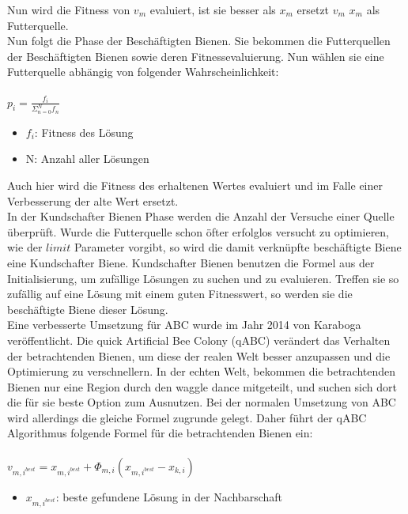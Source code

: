 Nun wird die Fitness von $v_{m}$ evaluiert, ist sie besser als $x_m$ ersetzt $v_m$ $x_m$ als Futterquelle.\\
Nun folgt die Phase der Beschäftigten Bienen. Sie bekommen die Futterquellen der Beschäftigten Bienen sowie deren Fitnessevaluierung.  Nun wählen sie eine Futterquelle abhängig von folgender Wahrscheinlichkeit:\\\\ 
\large
$p_i=\frac{f_i}{\Sigma^N_{n=0}f_n}$
\normalsize
\begin{itemize}
  \item $f_i$: Fitness des Lösung
  \item N: Anzahl aller Lösungen
\end{itemize}
Auch hier wird die Fitness des erhaltenen Wertes evaluiert und im Falle einer Verbesserung der alte Wert ersetzt.\\
In der Kundschafter Bienen Phase werden die Anzahl der Versuche einer Quelle überprüft. Wurde die Futterquelle schon öfter erfolglos versucht zu optimieren, wie der $limit$ Parameter vorgibt, so wird die damit verknüpfte beschäftigte Biene eine Kundschafter Biene. Kundschafter Bienen benutzen die Formel aus der Initialisierung, um zufällige Lösungen zu suchen und zu evaluieren. Treffen sie so  zufällig auf eine Lösung mit einem guten Fitnesswert, so werden sie die beschäftigte Biene dieser Lösung.\\
Eine verbesserte Umsetzung für ABC wurde im Jahr 2014 von Karaboga veröffentlicht. Die quick Artificial Bee Colony (qABC) verändert das Verhalten der betrachtenden Bienen, um diese der realen Welt besser anzupassen und die Optimierung zu verschnellern. In der echten Welt, bekommen die betrachtenden Bienen nur eine Region durch den waggle dance mitgeteilt, und suchen sich dort die für sie beste Option zum Ausnutzen. Bei der normalen Umsetzung von ABC wird allerdings die gleiche Formel zugrunde gelegt. Daher führt der qABC Algorithmus folgende Formel für die betrachtenden Bienen ein:\\\\\large
$v_{m,i^{best}}= x_{m,i^{best}}+\Phi_{m,i}( x_{m,i^{best}}- x_{k,i})$
\normalsize
\begin{itemize}
  \item $x_{m,i^{best}}$: beste gefundene Lösung in der Nachbarschaft
\end{itemize}

